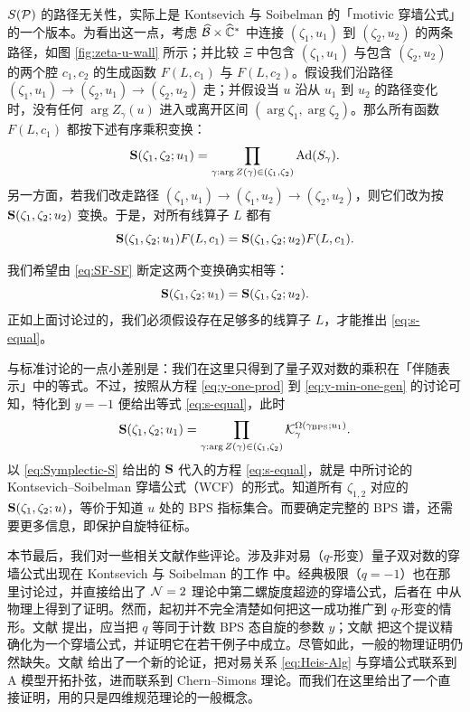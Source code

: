 $S(\mathcal{P})$ 的路径无关性，实际上是 Kontsevich 与 Soibelman \cite{ks1} 的「motivic 穿墙公式」的一个版本。为看出这一点，考虑 $\widehat{\mathcal{B}} \times \widehat{\mathbb{C}}^*$ 中连接 $(\zeta_1, u_1)$ 到 $(\zeta_2, u_2)$ 的两条路径，如图 \ref{fig:zeta-u-wall} 所示；并比较 $\Xi$ 中包含 $(\zeta_1, u_1)$ 与包含 $(\zeta_2,u_2)$ 的两个腔 $c_1,c_2$ 的生成函数 $F(L, c_1)$ 与 $F(L,c_2)$。假设我们沿路径 $(\zeta_1, u_1) \to (\zeta_2, u_1) \to (\zeta_2, u_2)$ 走；并假设当 $u$ 沿从 $u_1$ 到 $u_2$ 的路径变化时，没有任何 $\arg Z_\gamma(u)$ 进入或离开区间 $(\arg \zeta_1, \arg \zeta_2)$。那么所有函数 $F(L,c_1)$ 都按下述有序乘积变换：
\begin{equation}
{\mathbf S}(\zeta_1, \zeta_2;u_1) = \prod_{\gamma: \arg Z(\gamma) \in (\zeta_1, \zeta_2)} {\rm Ad}(S_\gamma).
\end{equation}
另一方面，若我们改走路径 $(\zeta_1, u_1) \to (\zeta_1, u_2) \to (\zeta_2, u_2)$，则它们改为按 ${\mathbf S}(\zeta_1, \zeta_2;u_2)$ 变换。于是，对所有线算子 $L$ 都有
\begin{equation}\label{eq:SF-SF}
{\mathbf S}(\zeta_1, \zeta_2;u_1)F(L,c_1)={\mathbf S}(\zeta_1, \zeta_2;u_2)F(L,c_1).
\end{equation}

我们希望由 \eqref{eq:SF-SF} 断定这两个变换确实相等：
\begin{equation} \label{eq:s-equal}
{\mathbf S}(\zeta_1, \zeta_2;u_1) = {\mathbf S}(\zeta_1, \zeta_2;u_2).
\end{equation}
正如上面讨论过的，我们必须假设存在足够多的线算子 $L$，才能推出 \eqref{eq:s-equal}。

与标准讨论的一点小差别是：我们在这里只得到了量子双对数的乘积在「伴随表示」中的等式。不过，按照从方程 \eqref{eq:y-one-prod} 到 \eqref{eq:y-min-one-gen} 的讨论可知，特化到 $y=-1$ 便给出等式 \eqref{eq:s-equal}，此时
\begin{equation}\label{eq:Symplectic-S}
{\mathbf S}(\zeta_1, \zeta_2;u_1) = \prod_{\gamma: \arg Z(\gamma) \in (\zeta_1, \zeta_2)} \mathcal{K}_\gamma^{\Omega(\gamma_{\rm BPS}; u_1)}.
\end{equation}
以 \eqref{eq:Symplectic-S} 给出的 ${\mathbf S}$ 代入的方程 \eqref{eq:s-equal}，就是 \cite{Gaiotto:2008cd,Gaiotto:2009hg} 中所讨论的 Kontsevich--Soibelman 穿墙公式（WCF）的形式。知道所有 $\zeta_{1,2}$ 对应的 ${\mathbf S}(\zeta_1, \zeta_2;u)$，等价于知道 $u$ 处的 BPS 指标集合。而要确定完整的 BPS 谱，还需要更多信息，即保护自旋特征标。

本节最后，我们对一些相关文献作些评论。涉及非对易（$q$-形变）量子双对数的穿墙公式出现在 Kontsevich 与 Soibelman 的工作 \cite{ks1} 中。经典极限（$q = -1$）也在那里讨论过，并直接给出了 $\mathcal{N}=2$ 理论中第二螺旋度超迹的穿墙公式，后者在 \cite{Gaiotto:2008cd} 中从物理上得到了证明。然而，起初并不完全清楚如何把这一成功推广到 $q$-形变的情形。文献 \cite{Dimofte:2009bv} 提出，应当把 $q$ 等同于计数 BPS 态自旋的参数 $y$；文献 \cite{Dimofte:2009tm} 把这个提议精确化为一个穿墙公式，并证明它在若干例子中成立。尽管如此，一般的物理证明仍然缺失。文献 \cite{Cecotti:2009uf} 给出了一个新的论证，把对易关系 \eqref{eq:Heis-Alg} 与穿墙公式联系到 A 模型开拓扑弦，进而联系到 Chern--Simons 理论。而我们在这里给出了一个直接证明，用的只是四维规范理论的一般概念。


